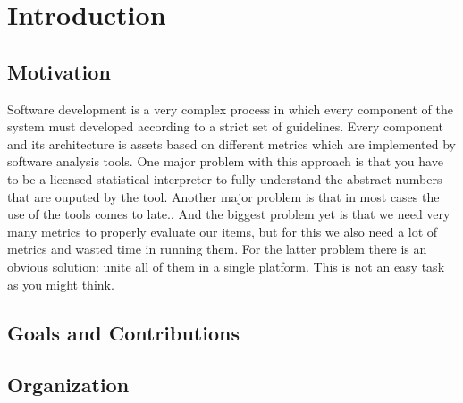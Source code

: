 \chapter{Introduction}\label{ch:1}

\section{Motivation}
	Software development is a very complex process in which every component of the
system must developed according to a strict set of guidelines. Every component
and its architecture is assets based on different metrics which are implemented
by software analysis tools. One major problem with this approach is that you
have to be a licensed statistical interpreter to fully understand the abstract
numbers that are ouputed by the tool. Another major problem is that in most
cases the use of the tools comes to late.\cite{tools:inCode}. And the biggest
problem yet is that we need very many metrics to properly evaluate our items,
but for this we also need a lot of metrics and wasted time in running them.
	For the latter problem there is an obvious solution: unite all of them
in a single platform. This is not an easy task as you might think.  



\section{Goals and Contributions}
	
	


\section {Organization}

	
